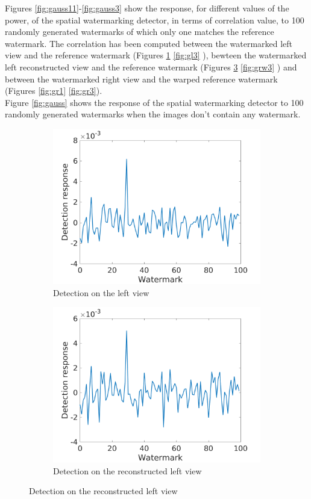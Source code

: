 Figures \ref{fig:gauss11}-\ref{fig:gauss3} show the response, for different values of the power, of the spatial watermarking detector, in terms of correlation value, to 100 randomly generated watermarks of which only one matches the reference watermark. The correlation has been computed between the watermarked left view and the reference watermark (Figures \ref{fig:gl1} \ref{fig:gl3} ), bewteen the watermarked left reconstructed view and the reference watermark (Figures \ref{fig:grw1} \ref{fig:grw3} ) and between the watermarked right view and the warped reference watermark (Figures \ref{fig:gr1} \ref{fig:gr3}).\\
Figure \ref{fig:gauss} shows the response of the spatial watermarking detector to 100 randomly generated watermarks when the images don't contain any watermark.

\begin{figure}[h!]
\centering
\begin{subfigure}[t]{0.5\textwidth}
\centering
\includegraphics[width=1\textwidth]{./img/corr_gauss/left_corr_value_1.png}
  \caption{\small{Detection on the left view}\label{fig:gl1}}
\end{subfigure}%
\begin{subfigure}[t]{0.5\textwidth}
\centering
\includegraphics[width=1\textwidth]{./img/corr_gauss/right_warpedwat_corr_value_1.png}
\caption{\small{Detection on the reconstructed left view}\label{fig:grw1}}


\end{subfigure}
\end{figure}
